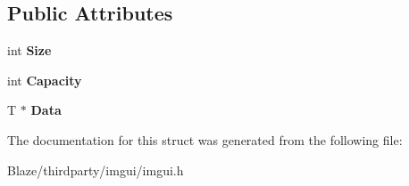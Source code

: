 \subsection*{Public Attributes}
\begin{DoxyCompactItemize}
\item 
\mbox{\label{structImVector_abbfd157947f66280d27b21d70a16df8d}} 
int {\bfseries Size}
\item 
\mbox{\label{structImVector_abd24482b4d30d22e37582e521e5bfb33}} 
int {\bfseries Capacity}
\item 
\mbox{\label{structImVector_ac0e46e8b30cb079d93c8f0aad7d7cbd0}} 
T $\ast$ {\bfseries Data}
\end{DoxyCompactItemize}


The documentation for this struct was generated from the following file\+:\begin{DoxyCompactItemize}
\item 
Blaze/thirdparty/imgui/imgui.\+h\end{DoxyCompactItemize}
